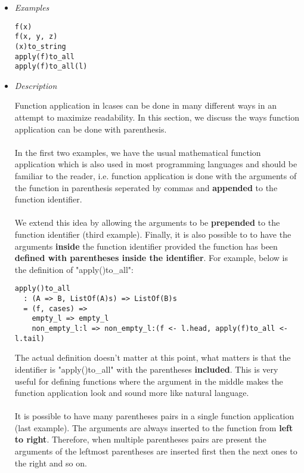 \documentclass{article}
\begin{document}
\begin{itemize}
\item \textit{Examples}

\begin{verbatim}
f(x)
f(x, y, z)
(x)to_string
apply(f)to_all
apply(f)to_all(l)
\end{verbatim}

\item \textit{Description}

Function application in lcases can be done in many different ways in an attempt to 
maximize readability. In this section, we discuss the ways function application can
be done with parenthesis.
\\\\
In the first two examples, we have the usual mathematical
function application which is also used in most programming languages and
should be familiar to the reader, i.e. function application is done with the 
arguments of the function in parenthesis seperated by commas and \textbf{appended}
to the function identifier.
\\\\
We extend this idea by allowing the arguments to be \textbf{prepended} to the
function identifier (third example). Finally, it is also possible to to have
the arguments \textbf{inside} the function identifier provided the function has
been \textbf{defined with parentheses inside the identifier}. For example,
below is the definition of "apply()to\_all":

\begin{verbatim}
apply()to_all
  : (A => B, ListOf(A)s) => ListOf(B)s
  = (f, cases) =>
    empty_l => empty_l
    non_empty_l:l => non_empty_l:(f <- l.head, apply(f)to_all <- l.tail)
\end{verbatim}
The actual definition doesn't matter at this point, what matters is that the 
identifier is "apply()to\_all" with the parentheses \textbf{included}. This is very
useful for defining functions where the argument in the middle makes the function
application look and sound more like natural language.
\\\\
It is possible to have many parentheses pairs in a single function application
(last example). The arguments are always inserted to the function from
\textbf{left to right}.  Therefore, when multiple parentheses pairs are present
the arguments of the leftmost parentheses are inserted first then the next ones
to the right and so on.


\end{itemize}
\end{document}
